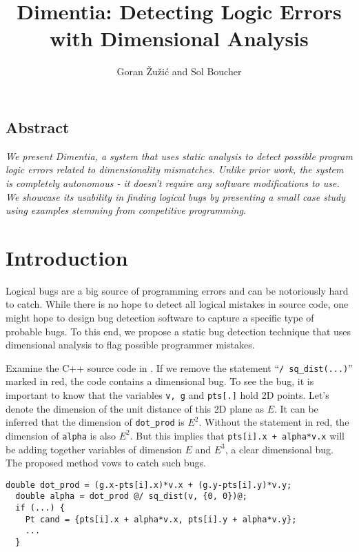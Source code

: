 \documentclass[12pt]{article}
\title{\Large Dimentia: Detecting Logic Errors with Dimensional Analysis}
\author{Goran \v{Z}u\v{z}i\'c and Sol Boucher}
\begin{document}
\maketitle
{}%


\begin{center}
\section*{Abstract}
\parbox{0.8\linewidth}{\textit{We present \textnormal{Dimentia}, a system that uses static analysis to detect possible program logic errors related to dimensionality mismatches.
Unlike prior work, the system is completely autonomous - it doesn't require any software modifications to use.
We showcase its usability in finding logical bugs by presenting a small case study using examples stemming from competitive programming.}}
\end{center}

\newpage
{}%

\section{Introduction}

Logical bugs are a big source of programming errors and can be notoriously hard to catch.
While there is no hope to detect all logical mistakes in source code, one might hope to design bug detection software to capture a specific type of probable bugs.
To this end, we propose a static bug detection technique that uses dimensional analysis to flag possible programmer mistakes.

Examine the C++ source code in .
If we remove the statement ``\texttt{/ sq\_dist(...)}'' marked in red, the code contains a dimensional bug.
To see the bug, it is important to know that the variables \texttt{v, g} and \texttt{pts[.]} hold 2D points.
Let's denote the dimension of the unit distance of this 2D plane as $E$.
It can be inferred that the dimension of \texttt{dot\_prod} is $E^2$.
Without the statement in red, the dimension of \texttt{alpha} is also $E^2$.
But this implies that \texttt{pts[i].x + alpha*v.x} will be adding together variables of dimension $E$ and $E^3$, a clear dimensional bug.
The proposed method vows to catch such bugs.

\begin{lstlisting}[label=code:example1,caption=Example of a dimensional bug]
  double dot_prod = (g.x-pts[i].x)*v.x + (g.y-pts[i].y)*v.y;
  double alpha = dot_prod @/ sq_dist(v, {0, 0})@;
  if (...) {
    Pt cand = {pts[i].x + alpha*v.x, pts[i].y + alpha*v.y};
    ...
  }
\end{lstlisting}
\end{document}
